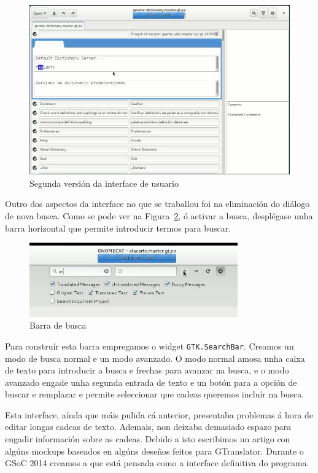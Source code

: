 \begin{figure}[h!]
  \centering
    \includegraphics[width=\textwidth]{img/curso2014_it1_ui.png}
    \caption{Segunda versión da interface de usuario}
    \label{fig:ui:v2:general}
\end{figure}

Outro dos aspectos da interface no que se traballou foi na eliminación do diálogo de nova busca. Como se pode ver na Figura~\ref{fig:ui:v2:search}, ó activar a busca, desplégase unha barra horizontal que permite introducir termos para buscar.

\begin{figure}[h!]
  \centering
    \includegraphics[width=0.8\textwidth]{img/curso2014_it2_search.png}
    \caption{Barra de busca}
    \label{fig:ui:v2:search}
\end{figure}

Para construír esta barra empregamos o widget \lstinline{GTK.SearchBar}. Creamos un modo de busca normal e un modo avanzado. O modo normal amosa unha caixa de texto para introducir a busca e frechas para avanzar na busca, e o modo avanzado engade unha segunda entrada de texto e un botón para a opción de buscar e remplazar e permite seleccionar que cadeas queremos incluír na busca.

Esta interface, aínda que máis pulida cá anterior, presentaba problemas á hora de editar longas cadeas de texto. Ademais, non deixaba demasiado espazo para engadir información sobre as cadeas. Debido a isto escribimos un artigo con algúns mockups baseados en algúns deseños feitos para GTranslator. Durante o GSoC 2014 creamos a que está pensada como a interface definitiva do programa.

